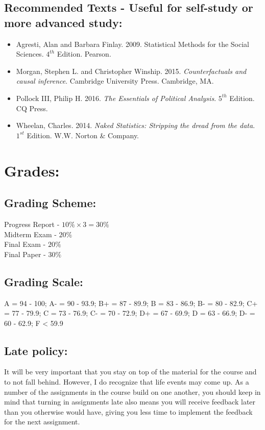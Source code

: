 \documentclass[11pt, a4paper]{article}
\begin{document}
    \subsection*{Recommended Texts - Useful for self-study or more advanced study:}
        \begin{itemize}
            \item Agresti, Alan and Barbara Finlay. 2009. Statistical Methods for the Social Sciences. $4^{th}$ Edition. Pearson.
            \item Morgan, Stephen L. and Christopher Winship. 2015. \textit{Counterfactuals and causal inference}. Cambridge University Press. Cambridge, MA.
            \item Pollock III, Philip H. 2016. \textit{The Essentials of Political Analysis}. $5^{th}$ Edition. CQ Press.
            \item Wheelan, Charles. 2014. \textit{Naked Statistics: Stripping the dread from the data}. $1^{st}$ Edition. W.W. Norton \& Company.
        \end{itemize}
\section*{Grades:}
    \subsection*{Grading Scheme:}
    Progress Report - $10\% \times 3 = 30\%$ \\  

    Midterm Exam - $20\%$ \\

    Final Exam - $20\%$ \\

    Final Paper - $30\%$

    \subsection*{Grading Scale:}
    A = 94 - 100; A- = 90 - 93.9; B+ = 87 - 89.9; B = 83 - 86.9; B- = 80 - 82.9; C+ = 77 - 79.9; C = 73 - 76.9; C- = 70 - 72.9; D+ = 67 - 69.9; D = 63 - 66.9; D- = 60 - 62.9; F < 59.9
    \subsection*{Late policy:}
It will be very important that you stay on top of the material for the course and to not fall behind. However, I do recognize that life events may come up. As a number of the assignments in the course build on one another, you should keep in mind that turning in assignments late also means you will receive feedback later than you otherwise would have, giving you less time to implement the feedback for the next assignment. 
\end{document}
